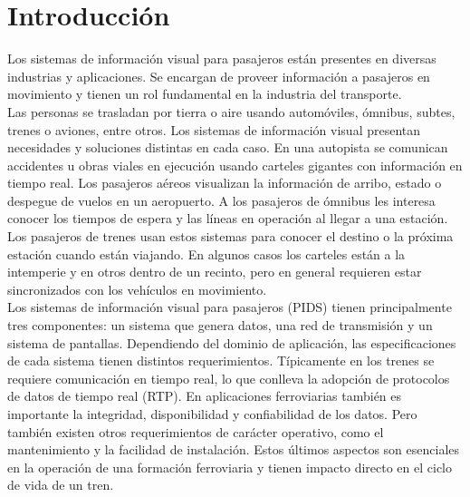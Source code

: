 
\newcommand{\keyword}[1]{\textbf{#1}}
\newcommand{\tabhead}[1]{\textbf{#1}}
\newcommand{\code}[1]{\texttt{#1}}
\newcommand{\file}[1]{\texttt{\bfseries#1}}
\newcommand{\option}[1]{\texttt{\itshape#1}}
\newcommand{\grados}{$^{\circ}$}



\chapter{Introducción} %
\label{Chapter1} %
\label{Intro}

Los sistemas de información visual para pasajeros están presentes en diversas industrias y aplicaciones. Se encargan de proveer información a pasajeros en  movimiento y tienen un rol fundamental en la industria del transporte.\\

 Las personas se trasladan por tierra o aire usando automóviles, ómnibus, subtes, trenes o aviones, entre otros. Los sistemas de información visual presentan necesidades y soluciones distintas en cada caso. En una autopista se comunican accidentes u obras viales en ejecución usando carteles gigantes con información en tiempo real. Los pasajeros aéreos visualizan la información de arribo, estado o despegue de vuelos en un aeropuerto. A los pasajeros de ómnibus les interesa conocer los tiempos de espera y las líneas en operación al llegar a una estación. Los pasajeros de trenes usan estos sistemas para conocer el destino o la próxima estación cuando están viajando. En algunos casos los carteles están a la intemperie y en  otros dentro de un recinto, pero en general requieren estar sincronizados con los vehículos en movimiento. \\

Los sistemas de información visual para pasajeros (PIDS) tienen principalmente tres componentes: un sistema que genera datos, una red de transmisión y un sistema de pantallas. Dependiendo del dominio de aplicación, las especificaciones de cada sistema tienen distintos requerimientos. Típicamente en los trenes se requiere comunicación en tiempo real, lo que conlleva la adopción de protocolos de datos de tiempo real (RTP). En aplicaciones ferroviarias también es importante la integridad, disponibilidad y confiabilidad de los datos. Pero también existen otros requerimientos de carácter operativo, como el mantenimiento y la facilidad de instalación. Estos últimos aspectos son esenciales en la operación de una formación ferroviaria y tienen impacto directo en el ciclo de vida de un tren.\\

